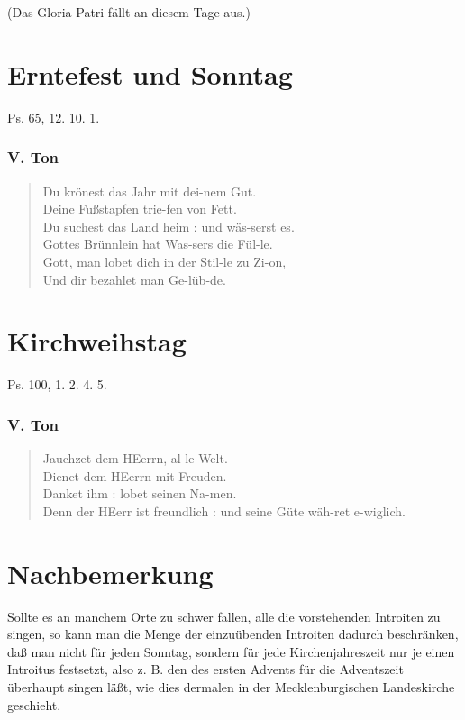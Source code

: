 (Das Gloria Patri fällt an diesem Tage aus.)

\section{Erntefest und Sonntag}

Ps. 65, 12. 10. 1.

\subsubsection{V. Ton}
\begin{verse}
Du krönest das Jahr mit dei-nem Gut.\\
Deine Fußstapfen trie-fen von Fett.\\
Du suchest das Land heim : und wäs-serst es.\\
Gottes Brünnlein hat Was-sers die Fül-le.\\
Gott, man lobet dich in der Stil-le zu Zi-on,\\
Und dir bezahlet man Ge-lüb-de.
\end{verse}

\section{Kirchweihstag}

Ps. 100, 1. 2. 4. 5.

\subsubsection{V. Ton}
\begin{verse}
Jauchzet dem HEerrn, al-le Welt.\\
Dienet dem HEerrn mit Freuden.\\
Danket ihm : lobet seinen Na-men.\\
Denn der HEerr ist freundlich : und seine Güte wäh-ret e-wiglich.
\end{verse}

\section{Nachbemerkung}

Sollte es an manchem Orte zu schwer fallen, alle die vorstehenden Introiten zu singen, so kann man die Menge der einzuübenden Introiten dadurch beschränken, daß man nicht für jeden Sonntag, sondern für jede Kirchenjahreszeit nur je einen Introitus festsetzt, also z. B. den des ersten Advents für die Adventszeit überhaupt singen läßt, wie dies dermalen in der Mecklenburgischen Landeskirche geschieht.

